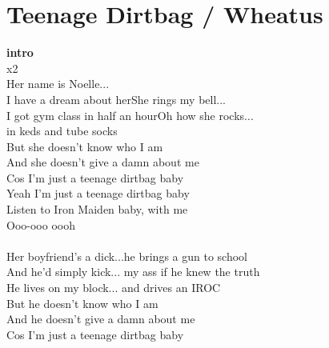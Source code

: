 \section{Teenage Dirtbag / Wheatus}\label{sec:teenagedirtbag}
\Cmajor
\BflatMajor
\Dminor
\DminorSeven
\DminorSix
\Fmajor
\Gseven



\textbf{intro}    \\
   x2\\
Her name is Noelle... \\
I have a dream about herShe rings my bell... \\
I got gym class in half an hourOh how she rocks...\\
in keds and tube socks\\
But she doesn’t know who I am \\
And she doesn’t give a damn about me\\
Cos I’m just a teenage dirtbag baby \\
Yeah I’m just a teenage dirtbag baby \\
Listen to Iron Maiden baby, with me \\
Ooo-ooo oooh \\
 \\
Her boyfriend’s a dick...he brings a gun to school\\
And he’d simply kick... my ass if he knew the truth\\
He lives on my block... and drives an IROC\\
But he doesn’t know who I am \\
And he doesn’t give a damn about me\\
Cos I’m just a teenage dirtbag baby \\
